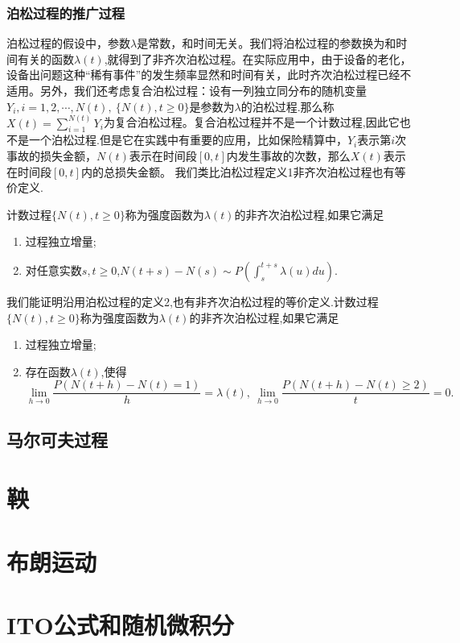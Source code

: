 \documentclass[lang=cn,10pt]{elegantbook}
\begin{document}
	\subsection{泊松过程的推广过程}
	泊松过程的假设中，参数\(\lambda\)是常数，和时间无关。我们将泊松过程的参数换为和时间有关的函数\(\lambda(t)\),就得到了非齐次泊松过程。在实际应用中，由于设备的老化，设备出问题这种“稀有事件”的发生频率显然和时间有关，此时齐次泊松过程已经不适用。另外，我们还考虑复合泊松过程：设有一列独立同分布的随机变量\(Y_i,i=1,2,\cdots,N(t),\ \{N(t),t\ge 0\}\)是参数为\(\lambda\)的泊松过程.那么称\(X(t)=\sum_{i=1}^{N(t)}Y_i\)为复合泊松过程。复合泊松过程并不是一个计数过程,因此它也不是一个泊松过程.但是它在实践中有重要的应用，比如保险精算中，\(Y_i\)表示第\(i\)次事故的损失金额，\(N(t)\)表示在时间段\([0,t]\)内发生事故的次数，那么\(X(t)\)表示在时间段\([0,t]\)内的总损失金额。
	我们类比泊松过程定义1非齐次泊松过程也有等价定义.
	\begin{definition}[非齐次泊松过程1]
		计数过程\(\{N(t),t\ge0\}\)称为强度函数为\(\lambda(t)\)的非齐次泊松过程,如果它满足
		\begin{enumerate}
			\item 过程独立增量;
			\item 对任意实数\(s,t\ge 0\),\(N(t+s)-N(s)\sim P\left(\int_{s}^{t+s}\lambda(u)du\right)\).
		\end{enumerate}
	\end{definition}

	\begin{definition}[非齐次泊松过程2]
		我们能证明沿用泊松过程的定义2,也有非齐次泊松过程的等价定义.计数过程\(\{N(t),t\ge0\}\)称为强度函数为\(\lambda(t)\)的非齐次泊松过程,如果它满足
		\begin{enumerate}
			\item 过程独立增量;
			\item 存在函数\(\lambda(t)\),使得
			\[\lim_{h\to 0}\frac{P(N(t+h)-N(t)=1)}{h}=\lambda(t),\ \lim_{h\to 0}\frac{P(N(t+h)-N(t)\ge 2)}{t}=0.\]
		\end{enumerate}
	\end{definition}

	\section{马尔可夫过程}



	\chapter{鞅}
	\chapter{布朗运动}
	\chapter{ITO公式和随机微积分}
	
\end{document}
